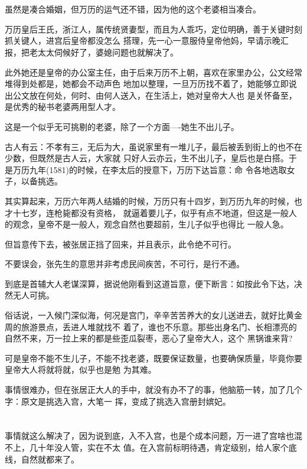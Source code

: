 \documentclass[11pt,a4paper,onecolumn]{article}
\begin{document}
\section[\thesection]{}

虽然是凑合婚姻，但万历的运气还不错，因为他的这个老婆相当凑合。

万历皇后王氏，浙江人，属传统贤妻型，而且为人乖巧，定位明确，善于关键时刻抓关键人，进宫后皇帝都没怎么
搭理，先一心一意服侍皇帝他妈，早请示晚汇报，把老太太伺候好了，婆媳问题也就解决了。

此外她还是皇帝的办公室主任，由于后来万历不上朝，喜欢在家里办公，公文经常堆得到处都是，她都会不动声色
地加以整理，一旦万历找不着了，她能够立即说出公文放在何处，何时、由何人送入，在生活上，她对皇帝大人也
是关怀备至，是优秀的秘书老婆两用型人才。

这是一个似乎无可挑剔的老婆，除了一个方面----她生不出儿子。

古人有云：不孝有三，无后为大，虽说家里有一堆儿子，最后被丢到街上的也不在少数，但既然是古人云，大家就
只好人云亦云，生不出儿子，皇后也是白搭。于是万历九年(1581)的时候，在李太后的授意下，万历下达旨意：命
令各地选取女子，以备挑选。

其实算起来，万历六年两人结婚的时候，万历只有十四岁，到万历九年的时候，也才十七岁，连枪毙都没有资格，
就逼着要儿子，似乎有点不地道，但这是一般人的观念，皇帝不是一般人，观念自然也要超前，生儿子似乎也得比
一般人急。

但旨意传下去，被张居正挡了回来，并且表示，此令绝不可行。

不要误会，张先生的意思并非考虑民间疾苦，不可行，是行不通。

到底是首辅大人老谋深算，据说他刚看到这道旨意，便下断言：如按此令下达，决然无人可挑。

俗话说，一入候门深似海，何况是宫门，辛辛苦苦养大的女儿送进去，就好比黄金周的旅游景点，丢进人堆就找不
着了，谁也不乐意。那些出身名门、长相漂亮的自然不来，万一拉上来的都是些歪瓜裂枣，恶心了皇帝大人，这个
黑锅谁来背?

可是皇帝不能不生儿子，不能不找老婆，既要保证数量，也要确保质量，毕竟你要皇帝大人将就将就，似乎也是勉
为其难。

事情很难办，但在张居正大人的手中，就没有办不了的事，他脑筋一转，加了几个字：原文是挑选入宫，大笔一
挥，变成了挑选入宫册封嫔妃。

\section[\thesection]{}

事情就这么解决了，因为说到底，入不入宫，也是个成本问题，万一进了宫啥也混不上，几十年没人管，实在不太
值。在入宫前标明待遇，肯定级别，给人家个底线，自然就都来了。
\end{document}
